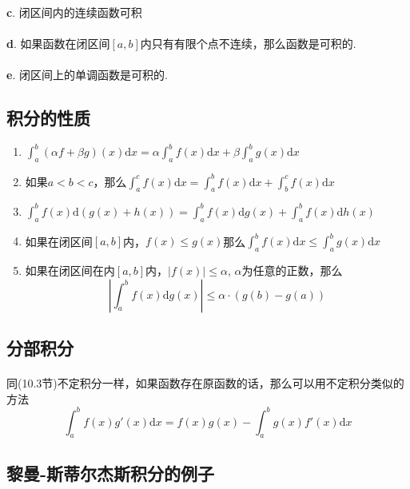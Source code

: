 \paragraph{}
\textbf{c}. 闭区间内的连续函数可积

\paragraph{}
\textbf{d}. 如果函数在闭区间$[a, b]$内只有有限个点不连续，那么函数是可积的.

\paragraph{}
\textbf{e}. 闭区间上的单调函数是可积的.


\subsection{积分的性质}
\begin{enumerate}
\item $\int_a^b (\alpha f + \beta g)(x) \mathrm{d} x = \alpha \int_a^b f(x) \mathrm{d} x + \beta \int_a^b g(x) \mathrm{d} x$
\item 如果$a < b < c$，那么$\int_a^c f(x) \mathrm{d} x = \int_a^b f(x)\mathrm{d} x + \int_b^c f(x) \mathrm{d} x$
\item $\int_a^b f(x) \mathrm{d} (g(x) + h(x)) = \int_a^b f(x) \mathrm{d} g(x) + \int_a^b f(x) \mathrm{d} h(x)$
\item 如果在闭区间$[a, b]$内，$f(x) \leq g(x)$那么$\int_a^b f(x) \mathrm{d} x \leq \int_a^b g(x) \mathrm{d} x$
\item 如果在闭区间在内$[a, b]$内，$|f(x)| \leq \alpha$, $\alpha$为任意的正数，那么
$$
|\int_a^b f(x) \mathrm{d} g(x)| \leq \alpha \cdot (g(b) - g(a))
$$
\end{enumerate}

\subsection{分部积分}
\paragraph{}
同(10.3节)不定积分一样，如果函数存在原函数的话，那么可以用不定积分类似的方法
$$
\int_a^b f(x) g'(x) \mathrm{d} x = f(x) g(x) - \int_a^b g(x) f'(x) \mathrm{d} x
$$

\subsection{黎曼-斯蒂尔杰斯积分的例子}
